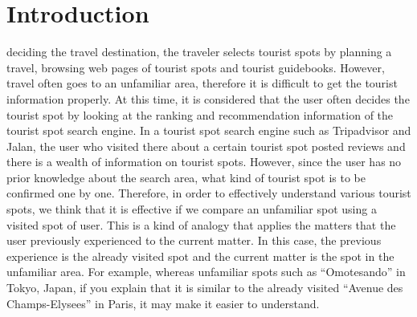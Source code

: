 \documentclass[journal]{IAENGtran}
\begin{document}
\section{Introduction}
\label{sec:Introduction}
 deciding the travel destination, the traveler selects tourist spots by planning a travel, browsing web pages of tourist spots and tourist guidebooks.
However, travel often goes to an unfamiliar area, therefore it is difficult to get the tourist information properly.
At this time, it is considered that the user often decides the tourist spot by looking at the ranking and recommendation information of the tourist spot search engine.
In a tourist spot search engine such as Tripadvisor and Jalan, the user who visited there about a certain tourist spot posted reviews and there is a wealth of information on tourist spots.
However, since the user has no prior knowledge about the search area, what kind of tourist spot is to be confirmed one by one.
Therefore, in order to effectively understand various tourist spots, we think that it is effective if we compare an unfamiliar spot using a visited spot of user.
This is a kind of analogy that applies the matters that the user previously experienced to the current matter. In this case, the previous experience is the already visited spot and the current matter is the spot in the unfamiliar area.
For example, whereas unfamiliar spots such as ``Omotesando'' in Tokyo, Japan, if you explain that it is similar to the already visited ``Avenue des Champs-Elysees'' in Paris, it may make it easier to understand.
\end{document}
